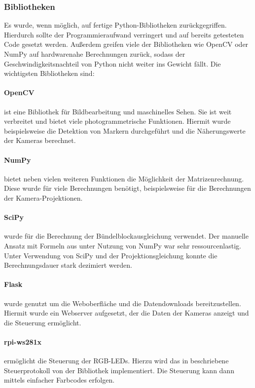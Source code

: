 \documentclass[./00PhotoBox.tex]{subfiles}
\begin{document}
\subsubsection{Bibliotheken}
Es wurde, wenn möglich, auf fertige Python-Bibliotheken zurückgegriffen. Hierdurch sollte der Programmieraufwand verringert und auf bereits getesteten Code gesetzt werden. Außerdem greifen viele der Bibliotheken wie OpenCV oder NumPy auf hardwarenahe Berechnungen zurück, sodass der Geschwindigkeitsnachteil von Python nicht weiter ins Gewicht fällt. Die wichtigsten Bibliotheken sind:

\paragraph{OpenCV}
ist eine Bibliothek für Bildbearbeitung und maschinelles Sehen. Sie ist weit verbreitet und bietet viele photogrammetrische Funktionen. Hiermit wurde beispielsweise die Detektion von Markern durchgeführt und die Näherungswerte der Kameras berechnet.

\paragraph{NumPy}
bietet neben vielen weiteren Funktionen die Möglichkeit der Matrizenrechnung. Diese wurde für viele Berechnungen benötigt, beispielsweise für die Berechnungen der Kamera-Projektionen.

\paragraph{SciPy}
wurde für die Berechnung der Bündelblockausgleichung verwendet. Der manuelle Ansatz mit Formeln aus \cite{luhmann} unter Nutzung von NumPy war sehr ressourcenlastig. Unter Verwendung von SciPy und der Projektionsgleichung konnte die Berechnungsdauer stark dezimiert werden.

\paragraph{Flask}
wurde genutzt um die Weboberfläche und die Datendownloads bereitzustellen. Hiermit wurde ein Webserver aufgesetzt, der die Daten der Kameras anzeigt und die Steuerung ermöglicht.

\paragraph{rpi-ws281x}
\label{p:ws281x}
ermöglicht die Steuerung der RGB-LEDs. Hierzu wird das in \cite{ws2811} beschriebene Steuerprotokoll von der Bibliothek implementiert. Die Steuerung kann dann mittels einfacher Farbcodes erfolgen.
\end{document}
